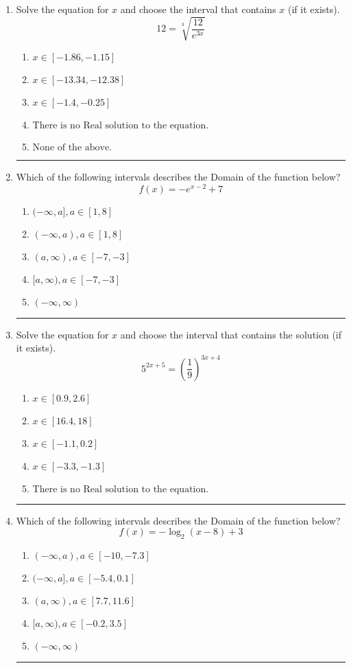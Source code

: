 \documentclass[14pt]{extbook}
\newcommand{\litem}[1]{\item#1\hspace*{-1cm}\rule{\textwidth}{0.4pt}}
\begin{document}
\begin{enumerate}
{\begin{enumerate}[label=\Alph*.]
\end{enumerate} }
\litem{
 Solve the equation for $x$ and choose the interval that contains $x$ (if it exists).\[  12 = \sqrt[3]{\frac{12}{e^{3x}}} \]\begin{enumerate}[label=\Alph*.]
\item \( x \in [-1.86, -1.15] \)
\item \( x \in [-13.34, -12.38] \)
\item \( x \in [-1.4, -0.25] \)
\item \( \text{There is no Real solution to the equation.} \)
\item \( \text{None of the above.} \)

\end{enumerate} }
\litem{
Which of the following intervals describes the Domain of the function below?\[ f(x) = -e^{x-2}+7 \]\begin{enumerate}[label=\Alph*.]
\item \( (-\infty, a], a \in [1, 8] \)
\item \( (-\infty, a), a \in [1, 8] \)
\item \( (a, \infty), a \in [-7, -3] \)
\item \( [a, \infty), a \in [-7, -3] \)
\item \( (-\infty, \infty) \)

\end{enumerate} }
\litem{
Solve the equation for $x$ and choose the interval that contains the solution (if it exists).\[ 5^{2x+5} = \left(\frac{1}{9}\right)^{3x+4} \]\begin{enumerate}[label=\Alph*.]
\item \( x \in [0.9, 2.6] \)
\item \( x \in [16.4, 18] \)
\item \( x \in [-1.1, 0.2] \)
\item \( x \in [-3.3, -1.3] \)
\item \( \text{There is no Real solution to the equation.} \)

\end{enumerate} }
\litem{
Which of the following intervals describes the Domain of the function below?\[ f(x) = -\log_2{(x-8)}+3 \]\begin{enumerate}[label=\Alph*.]
\item \( (-\infty, a), a \in [-10, -7.3] \)
\item \( (-\infty, a], a \in [-5.4, 0.1] \)
\item \( (a, \infty), a \in [7.7, 11.6] \)
\item \( [a, \infty), a \in [-0.2, 3.5] \)
\item \( (-\infty, \infty) \)


\end{enumerate}}
\end{enumerate}
\end{document}
